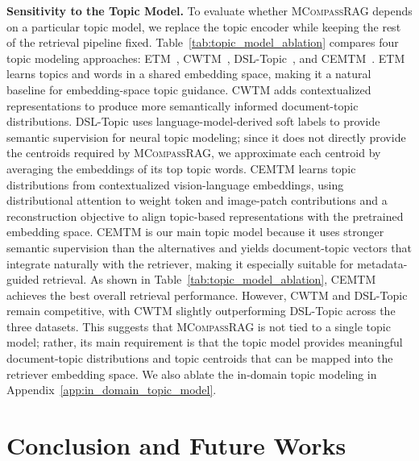 \documentclass{llmxive}
\providecommand{\name}[1]{\textsc{MCompassRAG}\xspace}
\begin{document}
\noindent
\textbf{Sensitivity to the Topic Model. }
To evaluate whether \name{} depends on a particular topic model, we replace the topic encoder while keeping the rest of the retrieval pipeline fixed. Table~\ref{tab:topic_model_ablation} compares four topic modeling approaches: ETM~\cite{dieng-etal-2020-topic}, CWTM~\cite{fang-etal-2024-cwtm}, DSL-Topic~\cite{li2026improvingneuraltopicmodeling}, and CEMTM~\cite{abaskohi-etal-2025-cemtm}. ETM learns topics and words in a shared embedding space, making it a natural baseline for embedding-space topic guidance. CWTM adds contextualized representations to produce more semantically informed document-topic distributions. DSL-Topic uses language-model-derived soft labels to provide semantic supervision for neural topic modeling; since it does not directly provide the centroids required by \name{}, we approximate each centroid by averaging the embeddings of its top topic words. CEMTM learns topic distributions from contextualized vision-language embeddings, using distributional attention to weight token and image-patch contributions and a reconstruction objective to align topic-based representations with the pretrained embedding space. CEMTM is our main topic model because it uses stronger semantic supervision than the alternatives and yields document-topic vectors that integrate naturally with the retriever, making it especially suitable for metadata-guided retrieval. As shown in Table~\ref{tab:topic_model_ablation}, CEMTM achieves the best overall retrieval performance. However, CWTM and DSL-Topic remain competitive, with CWTM slightly outperforming DSL-Topic across the three datasets. This suggests that \name{} is not tied to a single topic model; rather, its main requirement is that the topic model provides meaningful document-topic distributions and topic centroids that can be mapped into the retriever embedding space. We also ablate the in-domain topic modeling in Appendix~\ref{app:in_domain_topic_model}.
\section{Conclusion and Future Works}
\label{sec:conclusion}
\end{document}
